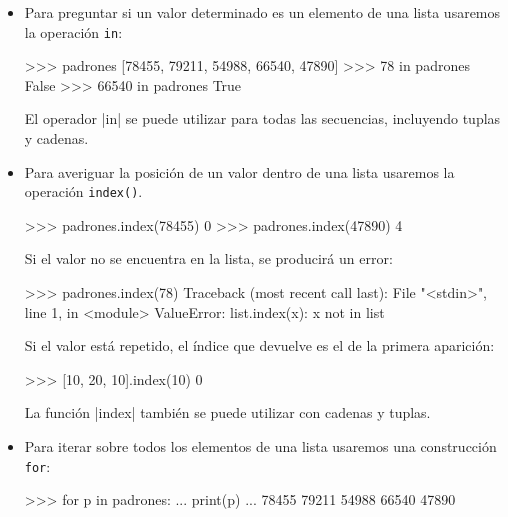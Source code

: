 \begin{itemize}
\item Para preguntar si un valor determinado es un elemento de una lista
usaremos la operación \lstinline+in+:

\begin{codigo-python-sn}
>>> padrones
[78455, 79211, 54988, 66540, 47890]
>>> 78 in padrones
False
>>> 66540 in padrones
True
\end{codigo-python-sn}

\begin{observacion}
El operador |in| se puede utilizar para todas las secuencias, incluyendo
tuplas y cadenas.
\end{observacion}

\item Para averiguar la posición de un valor dentro de una lista usaremos
la operación \lstinline+index()+.

\begin{codigo-python-sn}
>>> padrones.index(78455)
0
>>> padrones.index(47890)
4
\end{codigo-python-sn}

\begin{atencion}
Si el valor no se encuentra en la lista, se producirá un error:

\begin{codigo-python-sn}
>>> padrones.index(78)
Traceback (most recent call last):
  File "<stdin>", line 1, in <module>
ValueError: list.index(x): x not in list
\end{codigo-python-sn}
\end{atencion}

Si el valor está repetido, el índice que devuelve es el de la primera aparición:

\begin{codigo-python-sn}
>>> [10, 20, 10].index(10)
0
\end{codigo-python-sn}

\begin{observacion}
La función |index| también se puede utilizar con cadenas y tuplas.
\end{observacion}

\item Para iterar sobre todos los elementos de una lista usaremos una
construcción \lstinline+for+:

\begin{codigo-python-sn}
>>> for p in padrones:
...     print(p)
...
78455
79211
54988
66540
47890
\end{codigo-python-sn}


\end{itemize}
